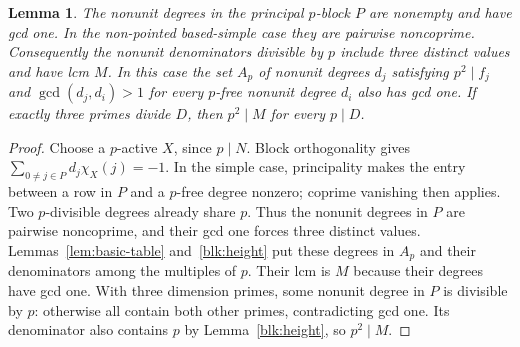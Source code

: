 \documentclass[11pt]{amsart}
\numberwithin{equation}{section}
\newtheorem{lemma}[theorem]{Lemma}
\theoremstyle{definition}
\theoremstyle{plain}
\begin{document}
\begin{lemma}\label{blk:witness}
The nonunit degrees in the principal $p$-block $P$ are nonempty
and have gcd one. In the non-pointed based-simple case they are
pairwise noncoprime. Consequently the nonunit denominators divisible
by $p$ include three distinct values and have lcm $M$.
In this case the set $A_p$ of nonunit degrees $d_j$ satisfying
$p^2\mid f_j$ and $\gcd(d_j,d_i)>1$ for every $p$-free nonunit
degree $d_i$ also has gcd one. If exactly three primes divide $D$,
then $p^2\mid M$ for every $p\mid D$.
\end{lemma}
\begin{proof}
Choose a $p$-active $X$, since $p\mid N$. Block orthogonality gives
$\sum_{0\ne j\in P}d_j\chi_X(j)=-1$. In the simple case,
principality makes the entry between a row in $P$ and a $p$-free
degree nonzero; coprime vanishing then applies. Two $p$-divisible
degrees already share $p$. Thus the nonunit degrees in $P$ are
pairwise noncoprime, and their gcd one forces three distinct values.
Lemmas~\ref{lem:basic-table} and~\ref{blk:height} put these degrees
in $A_p$ and their denominators among the multiples of $p$.
Their lcm is $M$ because their degrees have gcd one.
With three dimension primes, some nonunit degree in $P$ is divisible
by $p$: otherwise all contain both other primes, contradicting gcd
one. Its denominator also contains $p$ by Lemma~\ref{blk:height},
so $p^2\mid M$.
\end{proof}
\end{document}
